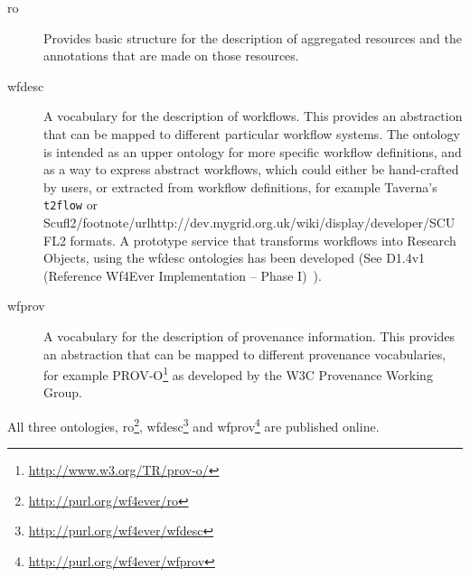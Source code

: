 \begin{description}
\item[ro] Provides basic structure for the description of aggregated
  resources and the annotations that are made on those resources.
\item[wfdesc] A vocabulary for the description of workflows. This
  provides an abstraction that can be mapped to different particular
  workflow systems. The ontology is intended as an upper ontology for more specific workflow definitions, and as a way to express abstract workflows, which could either be hand-crafted by users, or extracted from workflow definitions, for example Taverna's \texttt{t2flow} \cite{DBLP:conf/ssdbm/MissierSOTNDWOG10} or Scufl2/footnote{/url{http://dev.mygrid.org.uk/wiki/display/developer/SCUFL2}} formats. A prototype service that transforms workflows into Research Objects, using the wfdesc ontologies has been developed (See D1.4v1 (Reference Wf4Ever Implementation -- Phase I)~\cite{D1.4v1}). 
\item[wfprov] A vocabulary for the description of provenance
  information. This provides an abstraction that can be mapped to
  different provenance vocabularies, for example PROV-O\footnote{\url{http://www.w3.org/TR/prov-o/}} as developed by the W3C Provenance Working Group.
\end{description}

All three ontologies, ro\footnote{\url{http://purl.org/wf4ever/ro}}, wfdesc\footnote{\url{http://purl.org/wf4ever/wfdesc}} and wfprov\footnote{\url{http://purl.org/wf4ever/wfprov}} are published online. 




